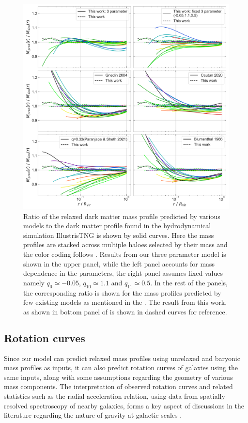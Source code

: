 \begin{figure}
    \centering
    \includegraphics[width=0.85\linewidth]{plots/relxn_model_comparison.pdf}
    \caption{Ratio of the relaxed dark matter mass profile predicted by various models to the dark matter profile found in the hydrodynamical simulation IllustrisTNG is shown by solid curves. Here the mass profiles are stacked across multiple haloes selected by their mass and the color coding follows . Results from our three parameter model  is shown in the upper panel, while the left panel accounts for mass dependence in the parameters, the right panel assumes fixed values namely $q_0\simeq-0.05$, $q_{10}\simeq1.1$ and $q_{11}\simeq0.5$. In the rest of the panels, the corresponding ratio is shown for the mass profiles predicted by few existing models as mentioned in the . The result from this work, as shown in bottom panel of  is shown in dashed curves for reference.}
    \label{fig:relxn_models_compare-ch:z0main}
\end{figure}


\subsection{Rotation curves}
Since our model can predict relaxed mass profiles using unrelaxed and baryonic mass profiles as inputs, it can also predict rotation curves of galaxies using the same inputs, along with some assumptions regarding the geometry of various mass components. 
The interpretation of observed rotation curves and related statistics such as the radial acceleration relation, using data from spatially resolved spectroscopy of nearby galaxies, forms a key aspect of discussions in the literature regarding the nature of gravity at galactic scales \citep[e.g.,][]{lms16b,lmsp17}. 

